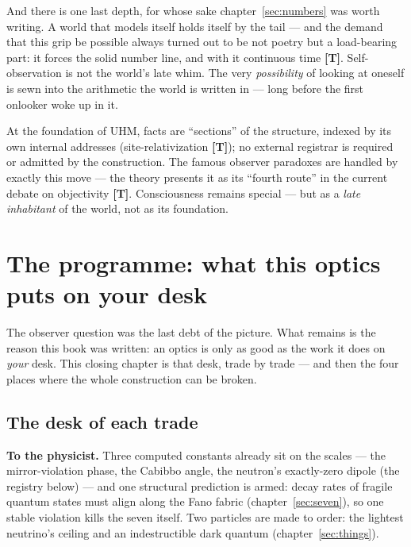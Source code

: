 \documentclass[11pt,letterpaper]{article}
\newcommand{\stT}{\textbf{[T]}\xspace}
\begin{document}
And there is one last depth, for whose sake chapter~\ref{sec:numbers}
was worth writing. A world that models itself holds itself by the
tail --- and the demand that this grip be possible always turned out
to be not poetry but a load-bearing part: it forces the solid number
line, and with it continuous time \stT. Self-observation is not the
world's late whim. The very \emph{possibility} of looking at oneself
is sewn into the arithmetic the world is written in --- long before
the first onlooker woke up in it.

\begin{factbox}[To be precise]
At the foundation of UHM, facts are ``sections'' of the structure,
indexed by its own internal addresses (site-relativization \stT); no
external registrar is required or admitted by the construction. The
famous observer paradoxes are handled by exactly this move --- the
theory presents it as its ``fourth route'' in the current debate on
objectivity \stT. Consciousness remains special --- but as a
\emph{late inhabitant} of the world, not as its foundation.
\end{factbox}

\section{The programme: what this optics puts on your desk}
\label{sec:check}

The observer question was the last debt of the picture. What remains
is the reason this book was written: an optics is only as good as
the work it does on \emph{your} desk. This closing chapter is that
desk, trade by trade --- and then the four places where the whole
construction can be broken.

\subsection*{The desk of each trade}

\textbf{To the physicist.} Three computed constants already sit on
the scales --- the mirror-violation phase, the Cabibbo angle, the
neutron's exactly-zero dipole (the registry below) --- and one
structural prediction is armed: decay rates of fragile quantum
states must align along the Fano fabric (chapter~\ref{sec:seven}),
so one stable violation kills the seven itself. Two particles are
made to order: the lightest neutrino's ceiling and an indestructible
dark quantum (chapter~\ref{sec:things}).
\end{document}
